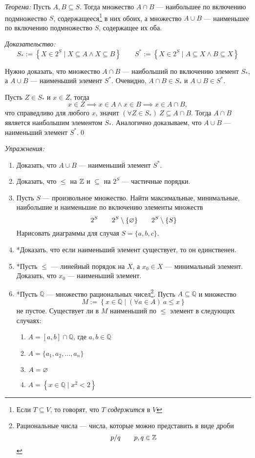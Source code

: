 \pagebreak
{\it Теорема:} Пусть $A,B\subseteq S$. Тогда множество $A\cap B$ ---
наибольшее по включению подмножество $S$, содержащееся\footnote{Если $T\subseteq V$,
  то говорят, что $T$ {\it содержится}
  в $V$} в них обоих,
а множество $A\cup B$ --- наименьшее по включению подмножество $S$,
содержащее их оба.

{\it Доказательство:}
\[
  S_{*}:=\left\{X\in 2^{S}\;\big|\; X\subseteq A\land X\subseteq B\right\}\qquad
  S^{*}:=\left\{X\in 2^{S}\;\big|\; A\subseteq X\land B\subseteq X\right\}
\]

Нужно доказать, что множество $A\cap B$ --- наибольший по включению элемент $S_{*}$,
а $A\cup B$ --- наименьший элемент $S^{*}$.
Очевидно, $A\cap B\in S_{*}$ и $A\cup B\in S^{*}$.

Пусть $Z\in S_{*}$ и $x\in Z$, тогда
\[
  x\in Z\implies x\in A\land x\in B\implies x\in A\cap B,
\]
что справедливо для любого $x$,
значит ${(\forall Z\in S_{*})~Z\subseteq A\cap B}$. Тогда
$A\cap B$ является наибольшим элементом $S_{*}$.
Аналогично доказываем, что $A\cup B$ --- наименьший элемент $S^{*}$.\qed

\newcommand\Q{\mathbb Q}
\vspace{1em}
{\it Упражнения:}
\begin{enumerate}
  \item{}Доказать, что $A\cup B$ --- наименьший элемент $S^{*}$.
  \item{}Доказать, что $\leq$ на $\mathbb Z$ и $\subseteq$ на $2^{S}$ --- частичные порядки.
  \item{}Пусть $S$ --- произвольное множество.
  Найти максимальные, минимальные, наибольшие и
  наименьшие по включению элементы множеств
  \[
    2^{S}\qquad 2^{S}\setminus\{\varnothing\}\qquad
    2^{S}\setminus \{S\}
  \]
  Нарисовать диаграммы для случая $S=\{a,b,c\}$.
  \item{}*Доказать, что если наименьший элемент существует, то
  он единственен.
  \item{}*Пусть $\leq$ --- линейный порядок на $X$, а $x_0\in X$ --- минимальный
  элемент. Доказать, что $x_0$ --- наименьший элемент.
  \index{множество!рациональных чисел, $\Q$}
  \item{}*Пусть $\Q$ --- множество рациональных чисел\footnote{
    Рациональные числа --- числа, которые можно представить в виде дроби
    \[
      p/q\qquad p,q\in\mathbb Z
    \]}.
  Пусть $A\subseteq \Q$ и множество
  \[
    M:=\left\{x\in \Q\;\big|\;(\forall a\in A)~a\leq x\right\}
  \]
  не пустое. Существует ли в $M$ наименьший по $\leq$ элемент
  в следующих случаях:
  \begin{multicols}{2}
    \begin{enumerate}
      \item{}$A=[a,b]\cap\Q$, где $a,b\in\Q$
      \item{}$A=\{a_1,a_2,...,a_{n}\}$
      \item{}$A=\varnothing$
      \item{}$A=\left\{x\in\Q\;\big|\; x^{2}<2\right\}$
    \end{enumerate}
  \end{multicols}
\end{enumerate}

